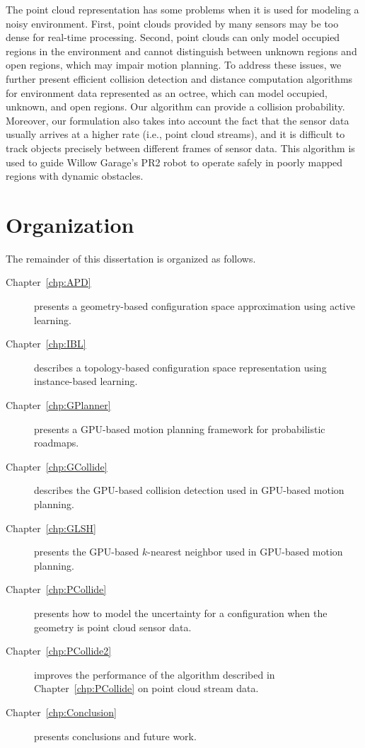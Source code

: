 The point cloud representation has some problems when it is used for modeling a noisy environment. First, point clouds provided by many
sensors may be too dense for real-time processing. Second, point clouds can only model occupied
regions in the environment and cannot distinguish between unknown regions and open regions, which may impair motion planning. To address these issues, we further present efficient collision detection and
distance computation algorithms for environment data represented as an octree, which can model occupied,
unknown, and open regions. Our algorithm can provide a collision probability. Moreover,
our formulation also takes into account the fact that the sensor data usually arrives at a higher rate (i.e., point cloud streams), and it is
difficult to track objects precisely between different frames of sensor data. This algorithm is used to guide Willow Garage's PR2 robot to operate safely in
poorly mapped regions with dynamic obstacles.

\section{Organization}
The remainder of this dissertation is organized as follows.

 \begin{description}
 \item[Chapter~\ref{chp:APD}] presents a geometry-based configuration space approximation using active learning.
 \item[Chapter~\ref{chp:IBL}] describes a topology-based configuration space representation using instance-based learning.
 \item[Chapter~\ref{chp:GPlanner}] presents a GPU-based motion planning framework for probabilistic roadmaps.
 \item[Chapter~\ref{chp:GCollide}] describes the GPU-based collision detection used in GPU-based motion planning.
 \item[Chapter~\ref{chp:GLSH}] presents the GPU-based $k$-nearest neighbor used in GPU-based motion planning.
 \item[Chapter~\ref{chp:PCollide}] presents how to model the uncertainty for a configuration when the geometry is point cloud sensor data.
 \item[Chapter~\ref{chp:PCollide2}] improves the performance of the algorithm described in Chapter~\ref{chp:PCollide} on point cloud stream data.
 \item[Chapter~\ref{chp:Conclusion}] presents conclusions and future work.
 \end{description}


